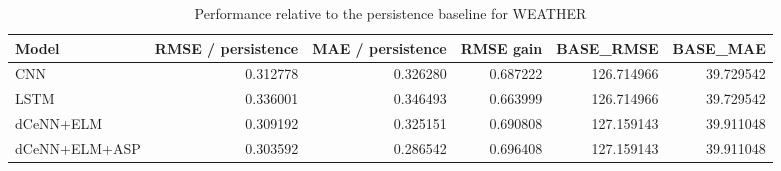 \begin{table}
\caption{Performance relative to the persistence baseline for WEATHER}
\begin{tabular}{lrrrrr}
\toprule
Model & RMSE / persistence & MAE / persistence & RMSE gain & BASE\_RMSE & BASE\_MAE \\
\midrule
CNN & 0.312778 & 0.326280 & 0.687222 & 126.714966 & 39.729542 \\
LSTM & 0.336001 & 0.346493 & 0.663999 & 126.714966 & 39.729542 \\
dCeNN+ELM & 0.309192 & 0.325151 & 0.690808 & 127.159143 & 39.911048 \\
dCeNN+ELM+ASP & 0.303592 & 0.286542 & 0.696408 & 127.159143 & 39.911048 \\
\bottomrule
\end{tabular}
\end{table}
